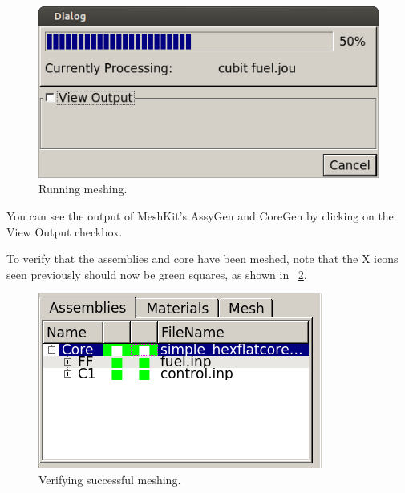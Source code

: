 \begin{figure}[H]
	\begin{center}
		\includegraphics[width=0.5\linewidth]{Images/mesh-5.png}
		\caption{Running meshing.}
		\label{fig:Mesh5}
	\end{center}
\end{figure}

You can see the output of MeshKit's AssyGen and CoreGen by clicking on the View Output checkbox.

To verify that the assemblies and core have been meshed, note that the X icons seen previously should now be green squares, as shown in ~\ref{fig:Mesh6}.

\begin{figure}[H]
	\begin{center}
		\includegraphics[width=0.5\linewidth]{Images/mesh-6.png}
		\caption{Verifying successful meshing.}
		\label{fig:Mesh6}
	\end{center}
\end{figure}